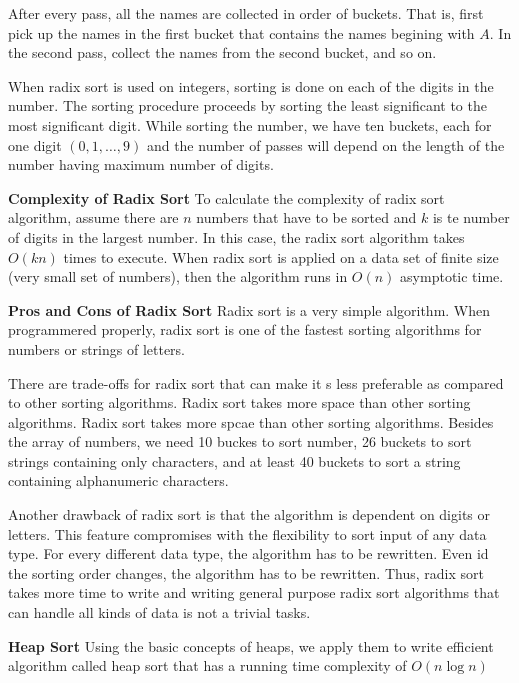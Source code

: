\vskip 1mm
After every pass, all the names are collected in order of buckets. That is, first  pick up the names in the first bucket that contains the names begining with $A$. In the second pass, collect the names from the second bucket, and so on.

\vskip 1mm
When radix sort is used on integers, sorting is done on each of the digits in the number. The sorting procedure proceeds by sorting the least significant to the most significant digit. While sorting the number, we have ten buckets, each for one digit $(0,1,\ldots,9)$ and the number of passes will depend on the length of the number having maximum number of digits.

\vskip 3mm
{\bf Complexity of Radix Sort}
\vskip 1mm
To calculate the complexity of radix sort algorithm, assume there are $n$ numbers that have to be sorted and $k$ is te number of digits in the largest number. In this case, the radix sort algorithm takes $O(kn)$ times to execute. When radix sort is applied on a data set of finite size (very small set of numbers), then the algorithm runs in $O(n)$ asymptotic time.

\vskip 3mm
{\bf Pros and Cons of Radix Sort}
Radix sort is a very simple algorithm. When programmered properly, radix sort is one of the fastest sorting algorithms for numbers or strings of letters.

\vskip 1mm
There are trade-offs for radix sort that can make it s less preferable as compared to other sorting algorithms. Radix sort takes more space than other sorting algorithms. Radix sort takes more spcae than other sorting algorithms. Besides the array of numbers, we need 10 buckes to sort number, 26 buckets to sort strings containing only characters, and at least 40 buckets to sort a string containing alphanumeric characters.

\vskip 1mm
Another drawback of radix sort is that the algorithm is dependent on digits or letters. This feature compromises with the flexibility  to sort input of any data type. For every different data type, the algorithm has to be rewritten. Even id the sorting order changes, the algorithm has to be rewritten. Thus, radix sort takes more time to write and writing general purpose radix sort algorithms that can handle all kinds of data is not a trivial tasks.

\filbreak
\vskip 1cm
{\bf Heap Sort}
\vskip 1mm
Using the basic concepts of heaps, we apply them to write efficient algorithm  called heap sort that has a running time complexity of $O(n\log n)$

